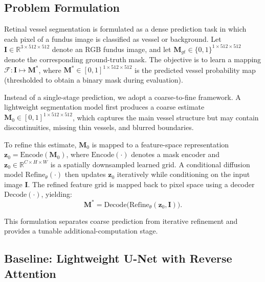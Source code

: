 \documentclass[jimaging,article,submit,pdftex,moreauthors]
  {Definitions/mdpi}
\begin{document}
\subsection{Problem Formulation}
\label{sec:problem}

Retinal vessel segmentation is formulated as a dense prediction task in which each pixel of a fundus image is classified as vessel or background. Let $\mathbf{I}\in\mathbb{R}^{3\times512\times512}$ denote an RGB fundus image, and let $\mathbf{M}_{gt}\in\{0,1\}^{1\times512\times512}$ denote the corresponding ground-truth mask. The objective is to learn a mapping $\mathcal{F}:\mathbf{I}\mapsto \mathbf{M}^*$, where $\mathbf{M}^*\in[0,1]^{1\times512\times512}$ is the predicted vessel probability map (thresholded to obtain a binary mask during evaluation).

Instead of a single-stage prediction, we adopt a coarse-to-fine framework. A lightweight segmentation model first produces a coarse estimate $\mathbf{M}_0\in[0,1]^{1\times512\times512}$, which captures the main vessel structure but may contain discontinuities, missing thin vessels, and blurred boundaries.

To refine this estimate, $\mathbf{M}_0$ is mapped to a feature-space representation $\mathbf{z}_0=\mathrm{Encode}(\mathbf{M}_0)$, where $\mathrm{Encode}(\cdot)$ denotes a mask encoder and $\mathbf{z}_0\in\mathbb{R}^{C\times H\times W}$ is a spatially downsampled learned grid. A conditional diffusion model $\mathrm{Refine}_{\theta}(\cdot)$ then updates $\mathbf{z}_0$ iteratively while conditioning on the input image $\mathbf{I}$. The refined feature grid is mapped back to pixel space using a decoder $\mathrm{Decode}(\cdot)$, yielding:
\begin{equation}
\mathbf{M}^* = \mathrm{Decode}\big(\mathrm{Refine}_{\theta}(\mathbf{z}_0, \mathbf{I})\big).
\end{equation}

This formulation separates coarse prediction from iterative refinement and provides a tunable additional-computation stage.

\subsection{Baseline: Lightweight U-Net with Reverse Attention}
\end{document}
